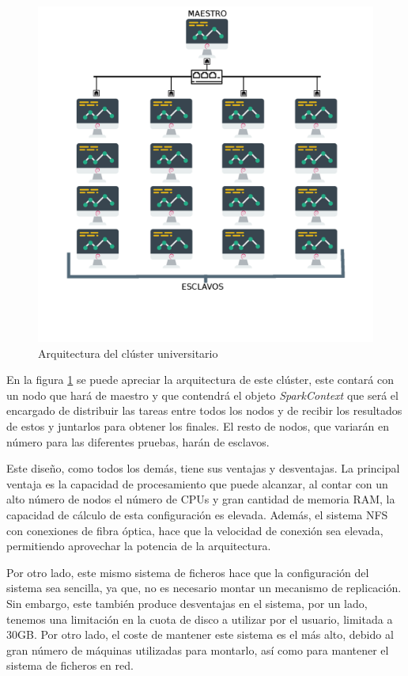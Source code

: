 \begin{figure}[ht]
\centering
\caption{Arquitectura del clúster universitario}
\label{fig:clusterUni}
\includegraphics[scale=0.25]{graphics/clusterUni}
\end{figure}

En la figura \ref{fig:clusterUni} se puede apreciar la arquitectura de este clúster, este contará con un nodo que hará de maestro y que contendrá el objeto \textit{SparkContext} que será el encargado de distribuir las tareas entre todos los nodos y de recibir los resultados de estos y juntarlos para obtener los finales. El resto de nodos, que variarán en número para las diferentes pruebas, harán de esclavos. 

Este diseño, como todos los demás, tiene sus ventajas y desventajas. La principal ventaja es la capacidad de procesamiento que puede alcanzar, al contar con un alto número de nodos el número de \gls{CPU}s y gran cantidad de memoria \gls{RAM}, la capacidad de cálculo de esta configuración es elevada. Además, el sistema \gls{NFS} con conexiones de fibra óptica, hace que la velocidad de conexión sea elevada, permitiendo aprovechar la potencia de la arquitectura.

Por otro lado, este mismo sistema de ficheros hace que la configuración del sistema sea sencilla, ya que, no es necesario montar un mecanismo de replicación. Sin embargo, este también produce desventajas en el sistema, por un lado, tenemos una limitación en la cuota de disco a utilizar por el usuario, limitada a 30GB. Por otro lado, el coste de mantener este sistema es el más alto, debido al gran número de máquinas utilizadas para montarlo, así como para mantener el sistema de ficheros en red.

